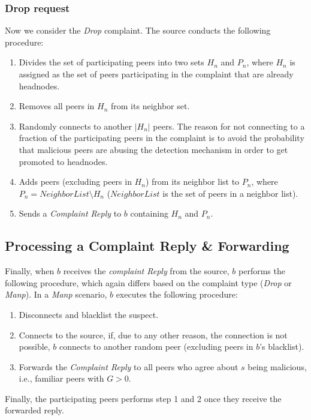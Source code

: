 \subsubsection*{Drop request}
Now we consider the \textit{Drop} complaint. The source conducts the following procedure:
\begin{enumerate}
 \item Divides the set of participating peers into two sets $H_n$ and $P_n$, where $H_n$ is assigned as the set of peers participating in the complaint that are already headnodes.
 \item Removes all peers in $H_n$ from its neighbor set.
 \item Randomly connects to another $|H_n|$ peers. 
 The reason for not connecting to a fraction of the participating peers in the complaint is to avoid the probability that malicious peers are abusing the detection mechanism in order to get promoted to headnodes.
 \item Adds peers (excluding peers in $H_n$) from its neighbor list to $P_n$, where $P_n = NeighborList\setminus H_n$ ($NeighborList$ is the set of peers in a neighbor list).
 \item Sends a \textit{Complaint Reply} to $b$ containing $H_n$ and $P_n$.
\end{enumerate}

\subsection{Processing a Complaint Reply \& Forwarding}

Finally, when $b$ receives the \textit{complaint Reply} from the source, $b$ performs the following procedure,
which again differs based on the complaint type (\textit{Drop} or \textit{Manp}).
In a \textit{Manp} scenario, $b$ executes the following procedure:
\begin{enumerate}
 \item Disconnects and blacklist the suspect.
 \item Connects to the source, if, due to any other reason, the connection is not possible, $b$ connects to another random peer (excluding peers in $b$'s blacklist).
 \item Forwards the \textit{Complaint Reply} to all peers who agree about $s$ being malicious, i.e., familiar peers with $G > 0$.
\end{enumerate}
Finally, the participating peers performs step 1 and 2 once they receive the forwarded reply.

